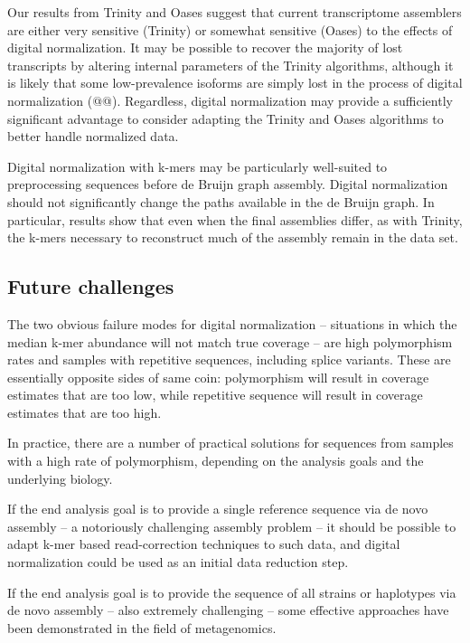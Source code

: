 \documentclass[10pt]{article}
\begin{document}
Our results from Trinity and Oases suggest that current transcriptome
assemblers are either very sensitive (Trinity) or somewhat sensitive
(Oases) to the effects of digital normalization.  It may be possible
to recover the majority of lost transcripts by altering internal
parameters of the Trinity algorithms, although it is likely that some
low-prevalence isoforms are simply lost in the process of digital
normalization (@@).  Regardless, digital normalization may provide
a sufficiently significant advantage to consider adapting the Trinity
and Oases algorithms to better handle normalized data.

Digital normalization with k-mers may be particularly well-suited to
preprocessing sequences before de Bruijn graph assembly.  Digital
normalization should not significantly change the paths available in
the de Bruijn graph.  In particular, results show that even when the
final assemblies differ, as with Trinity, the k-mers necessary to
reconstruct much of the assembly remain in the data set.


\subsection*{Future challenges}

The two obvious failure modes for digital normalization -- situations
in which the median k-mer abundance will not match true coverage --
are high polymorphism rates and samples with repetitive sequences,
including splice variants.  These are essentially opposite sides of
same coin: polymorphism will result in coverage estimates that are too
low, while repetitive sequence will result in coverage estimates that
are too high.

In practice, there are a number of practical solutions for sequences
from samples with a high rate of polymorphism, depending on the
analysis goals and the underlying biology.

If the end analysis goal is to provide a single reference sequence via
de novo assembly -- a notoriously challenging assembly problem -- it
should be possible to adapt k-mer based read-correction techniques to
such data, and digital normalization could be used as an initial data
reduction step.

If the end analysis goal is to provide the sequence of all strains or
haplotypes via de novo assembly -- also extremely challenging -- some
effective approaches have been demonstrated in the field of
metagenomics.
\end{document}
